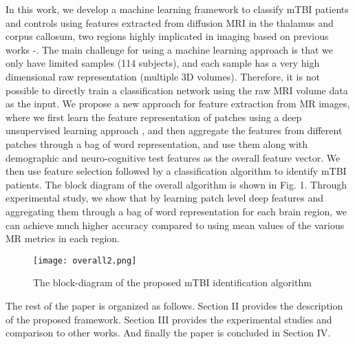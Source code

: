 \documentclass[letterpaper, 10 pt, conference]{ieeeconf}  %
\begin{document}
In this work, we develop a machine learning framework to classify mTBI patients and controls using features extracted from diffusion MRI in the thalamus and corpus callosum, two regions highly implicated in imaging based on previous works \cite{thal}-\cite{cc}.
The main challenge for using a machine learning approach is that we only have limited samples (114 subjects), and each sample has a very high dimensional raw representation (multiple 3D volumes). Therefore, it is not possible to directly train a classification network using the raw MRI volume data as the input.
We  propose a new approach for feature extraction from MR images, where  we first learn the feature representation of patches using a deep unsupervised learning approach \cite{dnn}, and then aggregate the features from different patches through a bag of word representation, and use them along with demographic and neuro-cognitive test features as the overall feature vector.
We then use feature selection followed by a classification algorithm to identify mTBI patients.
The block diagram of the overall algorithm is shown in Fig. 1.
Through experimental study, we show that by learning patch level deep features and aggregating them through
a bag of word representation for each brain region, we can achieve much higher accuracy compared to using mean values of the various MR metrics in each region.
\begin{figure}[h]
\begin{center}
    \texttt{[image: overall2.png]}
\end{center}
  \caption{The block-diagram of the proposed mTBI identification algorithm}
\end{figure}




The rest of the paper is organized as follows. 
Section II provides the description of the proposed framework. 
Section III provides the experimental studies and comparison to other works. 
And finally the paper is concluded in Section IV.
\end{document}

